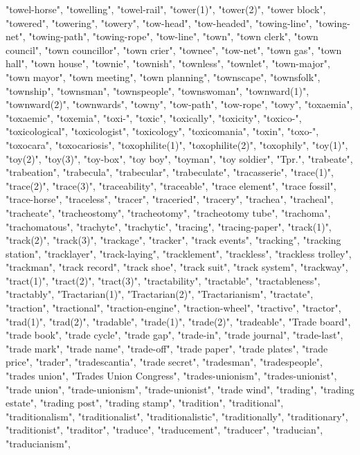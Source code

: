 "towel-horse",
"towelling",
"towel-rail",
"tower(1)",
"tower(2)",
"tower block",
"towered",
"towering",
"towery",
"tow-head",
"tow-headed",
"towing-line",
"towing-net",
"towing-path",
"towing-rope",
"tow-line",
"town",
"town clerk",
"town council",
"town councillor",
"town crier",
"townee",
"tow-net",
"town gas",
"town hall",
"town house",
"townie",
"townish",
"townless",
"townlet",
"town-major",
"town mayor",
"town meeting",
"town planning",
"townscape",
"townsfolk",
"township",
"townsman",
"townspeople",
"townswoman",
"townward(1)",
"townward(2)",
"townwards",
"towny",
"tow-path",
"tow-rope",
"towy",
"toxaemia",
"toxaemic",
"toxemia",
"toxi-",
"toxic",
"toxically",
"toxicity",
"toxico-",
"toxicological",
"toxicologist",
"toxicology",
"toxicomania",
"toxin",
"toxo-",
"toxocara",
"toxocariosis",
"toxophilite(1)",
"toxophilite(2)",
"toxophily",
"toy(1)",
"toy(2)",
"toy(3)",
"toy-box",
"toy boy",
"toyman",
"toy soldier",
"Tpr.",
"trabeate",
"trabeation",
"trabecula",
"trabecular",
"trabeculate",
"tracasserie",
"trace(1)",
"trace(2)",
"trace(3)",
"traceability",
"traceable",
"trace element",
"trace fossil",
"trace-horse",
"traceless",
"tracer",
"traceried",
"tracery",
"trachea",
"tracheal",
"tracheate",
"tracheostomy",
"tracheotomy",
"tracheotomy tube",
"trachoma",
"trachomatous",
"trachyte",
"trachytic",
"tracing",
"tracing-paper",
"track(1)",
"track(2)",
"track(3)",
"trackage",
"tracker",
"track events",
"tracking",
"tracking station",
"tracklayer",
"track-laying",
"tracklement",
"trackless",
"trackless trolley",
"trackman",
"track record",
"track shoe",
"track suit",
"track system",
"trackway",
"tract(1)",
"tract(2)",
"tract(3)",
"tractability",
"tractable",
"tractableness",
"tractably",
"Tractarian(1)",
"Tractarian(2)",
"Tractarianism",
"tractate",
"traction",
"tractional",
"traction-engine",
"traction-wheel",
"tractive",
"tractor",
"trad(1)",
"trad(2)",
"tradable",
"trade(1)",
"trade(2)",
"tradeable",
"Trade board",
"trade book",
"trade cycle",
"trade gap",
"trade-in",
"trade journal",
"trade-last",
"trade mark",
"trade name",
"trade-off",
"trade paper",
"trade plates",
"trade price",
"trader",
"tradescantia",
"trade secret",
"tradesman",
"tradespeople",
"trades union",
"Trades Union Congress",
"trades-unionism",
"trades-unionist",
"trade union",
"trade-unionism",
"trade-unionist",
"trade wind",
"trading",
"trading estate",
"trading post",
"trading stamp",
"tradition",
"traditional",
"traditionalism",
"traditionalist",
"traditionalistic",
"traditionally",
"traditionary",
"traditionist",
"traditor",
"traduce",
"traducement",
"traducer",
"traducian",
"traducianism",
